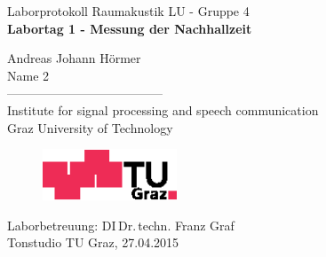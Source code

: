 \documentclass[11pt]{report}
\begin{document}
\begin{titlepage}
\begin{center}
  \vspace*{0.5cm}
  {\LARGE Laborprotokoll Raumakustik LU - Gruppe 4} \\
  \vspace{15mm}
  {\huge \bf Labortag 1 - Messung der Nachhallzeit \\}

  \vspace{15mm}
  {\LARGE Andreas Johann H\"ormer\\
Name 2} \\

  \vspace{10mm}%
  -------------------------------------- \\
  \vspace{10mm}%
  \large
  Institute for signal processing and speech communication \\
  Graz University of Technology \\


  \vspace{15mm}%
  \begin{figure}[!ht]
  \begin{center}
  \centerline{\includegraphics[width=4cm,keepaspectratio=true]{TULogoneu}}
  \end{center}
  \end{figure}
  \vspace{10mm}
Laborbetreuung: DI\,Dr.\,techn. Franz Graf \\
  \vfill
  Tonstudio TU Graz, 27.04.2015
  \vspace{0.5cm}
\end{center}
\end{titlepage}

\end{document}
